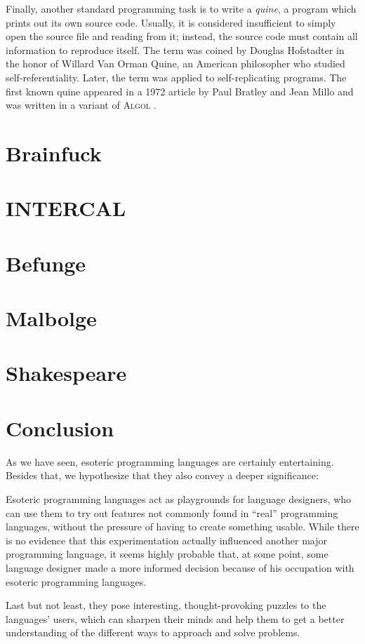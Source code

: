 \documentclass{sig-alternate}
\begin{document}
Finally, another standard programming task is to write a \emph{quine}, a program which prints out its own source code. Usually, it is considered insufficient to simply open the source file and reading from it; instead, the source code must contain all information to reproduce itself. The term was coined by Douglas Hofstadter \cite{hofstadter1979godel} in the honor of Willard Van Orman Quine, an American philosopher who studied self-referentiality. Later, the term was applied to self-replicating programs. The first known quine appeared in a 1972 article by Paul Bratley and Jean Millo and was written in a variant of \textsc{Algol} \cite{bratley1972computer}.

\section{Brainfuck}


\section{INTERCAL}


\section{Befunge}


\section{Malbolge}


\section{Shakespeare}


\section{Conclusion}

As we have seen, esoteric programming languages are certainly entertaining. Besides that, we hypothesize that they also convey a deeper significance:

Esoteric programming languages act as playgrounds for language designers, who can use them to try out features not commonly found in “real” programming languages, without the pressure of having to create something usable. While there is no evidence that this experimentation actually influenced another major programming language, it seems highly probable that, at some point, some language designer made a more informed decision because of his occupation with esoteric programming languages.

Last but not least, they pose interesting, thought-provoking puzzles to the languages' users, which can sharpen their minds and help them to get a better understanding of the different ways to approach and solve problems.

\printbibliography[prenote=prenote]
\end{document}

